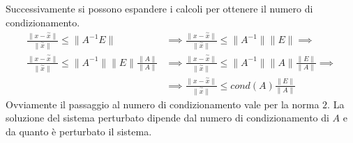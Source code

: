 Successivamente si possono espandere i calcoli per ottenere il numero di condizionamento.
\begin{equation*}
    \begin{aligned}
        \frac{\|x - \stackrel{\sim}{x}\|}{\|\stackrel{\sim}{x}\|} \leq \|A^{-1}E\|
         & \implies \frac{\|x - \stackrel{\sim}{x}\|}{\|\stackrel{\sim}{x}\|} \leq \|A^{-1}\|\|E\| \implies \\
        \frac{\|x - \stackrel{\sim}{x}\|}{\|\stackrel{\sim}{x}\|} \leq \|A^{-1}\|\|E\|\frac{\|A\|}{\|A\|} 
        & \implies \frac{\|x - \stackrel{\sim}{x}\|}{\|\stackrel{\sim}{x}\|} \leq \|A^{-1}\|\|A\|\frac{\|E\|}{\|A\|} \implies \\
        & \implies \frac{\|x - \stackrel{\sim}{x}\|}{\|\stackrel{\sim}{x}\|} \leq cond(A)\frac{\|E\|}{\|A\|}
    \end{aligned}
\end{equation*}
Ovviamente il passaggio al numero di condizionamento vale per la norma $2$. La
soluzione del sistema perturbato dipende dal numero di condizionamento di $A$ e
da quanto è perturbato il sistema.